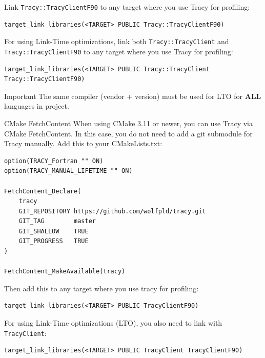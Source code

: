 \documentclass[hidelinks,titlepage,a4paper,twoside]{article}
\begin{document}
Link \texttt{Tracy::TracyClientF90} to any target where you use Tracy for profiling:

\begin{lstlisting}
target_link_libraries(<TARGET> PUBLIC Tracy::TracyClientF90)
\end{lstlisting}

For using Link-Time optimizations, link both \texttt{Tracy::TracyClient} and \texttt{Tracy::TracyClientF90} to any target where you use Tracy for profiling:

\begin{lstlisting}
target_link_libraries(<TARGET> PUBLIC Tracy::TracyClient Tracy::TracyClientF90)
\end{lstlisting}

\begin{bclogo}[
noborder=true,
couleur=black!5,
logo=\bcbombe
]{Important}
The same compiler (vendor + version) must be used for LTO for \textbf{ALL} languages in project.
\end{bclogo}

\begin{bclogo}[
noborder=true,
couleur=black!5,
logo=\bclampe
]{CMake FetchContent}
When using CMake 3.11 or newer, you can use Tracy via CMake FetchContent. In this case, you do not need to add a git submodule for Tracy manually. Add this to your CMakeLists.txt:

\begin{lstlisting}
option(TRACY_Fortran "" ON)
option(TRACY_MANUAL_LIFETIME "" ON)

FetchContent_Declare(
    tracy
    GIT_REPOSITORY https://github.com/wolfpld/tracy.git
    GIT_TAG        master
    GIT_SHALLOW    TRUE
    GIT_PROGRESS   TRUE
)

FetchContent_MakeAvailable(tracy)
\end{lstlisting}

Then add this to any target where you use tracy for profiling:

\begin{lstlisting}
target_link_libraries(<TARGET> PUBLIC TracyClientF90)
\end{lstlisting}

For using Link-Time optimizations (LTO), you also need to link with \texttt{TracyClient}:

\begin{lstlisting}
target_link_libraries(<TARGET> PUBLIC TracyClient TracyClientF90)
\end{lstlisting}
\end{bclogo}
\end{document}
